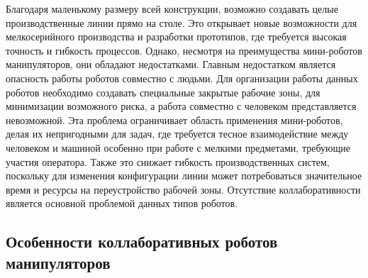 Благодаря маленькому размеру всей конструкции, возможно создавать целые производственные линии прямо на столе. Это открывает новые возможности для мелкосерийного производства и разработки прототипов, где требуется высокая точность и гибкость процессов. Однако, несмотря на преимущества мини-роботов манипуляторов, они обладают недостатками. Главным недостатком является опасность работы роботов совместно с людьми. Для организации работы данных роботов необходимо создавать специальные закрытые рабочие зоны, для минимизации возможного риска, а работа совместно с человеком представляется невозможной. 
Эта проблема ограничивает область применения мини-роботов, делая их непригодными для задач, где требуется тесное взаимодействие между человеком и машиной особенно при работе с мелкими предметами, требующие участия оператора. Также это снижает гибкость производственных систем, поскольку для изменения конфигурации линии может потребоваться значительное время и ресурсы на переустройство рабочей зоны. Отсутствие коллаборативности является основной проблемой данных типов роботов.


\subsection{Особенности коллаборативных роботов манипуляторов}



